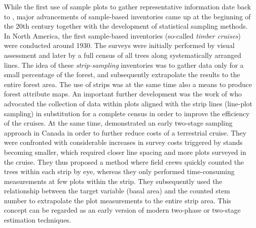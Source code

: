 While the first use of sample plots to gather representative information date back to \citet{hartig1795}, major advancements of sample-based inventories came up at the beginning of the 20th century together with the development of statistical sampling methods. In North America, the first sample-based inventories (so-called \textit{timber cruises}) were conducted around 1930. The surveys were initially performed by visual assessment and later by a full census of all trees along systematically arranged lines. The idea of these \textit{strip-sampling} inventories was to gather data only for a small percentage of the forest, and subsequently extrapolate the results to the entire forest area. The use of strips was at the same time also a means to produce forest attribute maps. An important further development was the work of \citet{goodspeed1934} who advocated the collection of data within plots aligned with the strip lines (line-plot sampling) in substitution for a complete census in order to improve the efficiency of the cruises. At the same time, \citet{langballe1938} demonstrated an early two-stage sampling approach in Canada in order to further reduce costs of a terrestrial cruise. They were confronted with considerable increases in survey costs triggered by stands becoming smaller, which required closer line spacing and more plots surveyed in the cruise. They thus proposed a method where field crews quickly counted the trees within each strip by eye, whereas they only performed time-consuming measurements at few plots within the strip. They subsequently used the relationship between the target variable (basal area) and the counted stem number to extrapolate the plot measurements to the entire strip area. This concept can be regarded as an early version of modern two-phase or two-stage estimation techniques.\par 


